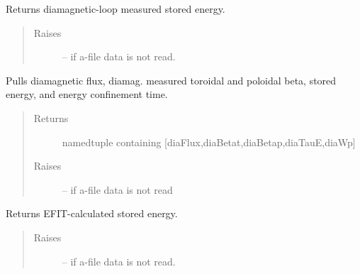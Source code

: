 \documentclass[letterpaper,10pt,english]{sphinxmanual}
\begin{document}
\begin{fulllineitems}
\begin{fulllineitems}
\begin{quote}
\begin{description}
\end{description}\end{quote}

\end{fulllineitems}


\begin{fulllineitems}
\label{eqtools:eqtools.eqdskreader.EqdskReader.getDiamagWp}
Returns diamagnetic-loop measured stored energy.
\begin{quote}\begin{description}
\item[{Raises }] \leavevmode
{} -- 
if a-file data is not read.

\end{description}\end{quote}

\end{fulllineitems}


\begin{fulllineitems}
\label{eqtools:eqtools.eqdskreader.EqdskReader.getDiamag}
Pulls diamagnetic flux, diamag. measured toroidal and poloidal beta, stored energy, and energy confinement time.
\begin{quote}\begin{description}
\item[{Returns}] \leavevmode
namedtuple containing {[}diaFlux,diaBetat,diaBetap,diaTauE,diaWp{]}

\item[{Raises }] \leavevmode
{} -- 
if a-file data is not read

\end{description}\end{quote}

\end{fulllineitems}


\begin{fulllineitems}
\label{eqtools:eqtools.eqdskreader.EqdskReader.getWMHD}
Returns EFIT-calculated stored energy.
\begin{quote}\begin{description}
\item[{Raises }] \leavevmode
{} -- 
if a-file data is not read.


\end{description}
\end{quote}
\end{fulllineitems}
\end{fulllineitems}
\end{document}
